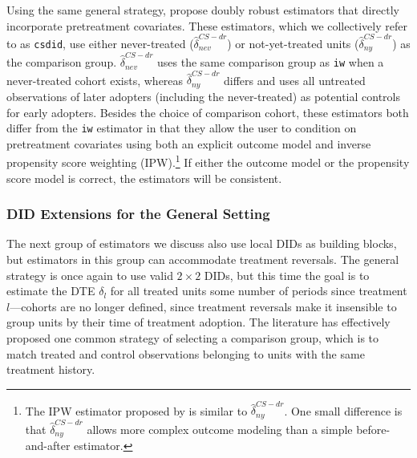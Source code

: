 \documentclass[12pt]{article}
\begin{document}
 Using the same general strategy, \citet{callaway2021-did} propose doubly robust estimators that directly incorporate pretreatment covariates. These estimators, which we collectively refer to as \texttt{csdid}, use either never-treated ($\hat\delta^{CS-dr}_{nev}$) or not-yet-treated units ($\hat\delta^{CS-dr}_{ny}$) as the comparison group. $\hat\delta^{CS-dr}_{nev}$ uses the same comparison group as \texttt{iw} when a never-treated cohort exists, whereas $\hat\delta^{CS-dr}_{ny}$ differs and uses all untreated observations of later adopters (including the never-treated) as potential controls for early adopters. Besides the choice of comparison cohort, these estimators both differ from the \texttt{iw} estimator in that they allow the user to condition on pretreatment covariates using both an explicit outcome model and inverse propensity score weighting (IPW).\footnote{The IPW estimator proposed by \citet{Strezhnev2018-ku} is similar to $\hat\delta^{CS-dr}_{ny}$. One small difference is that $\hat\delta^{CS-dr}_{ny}$ allows more complex outcome modeling than a simple before-and-after estimator.} If either the outcome model or the propensity score model is correct, the estimators will be consistent. 

\subsubsection{DID Extensions for the General Setting}
The next group of estimators we discuss also use local DIDs as building blocks, but estimators in this group can accommodate treatment reversals. The general strategy is once again to use valid $2\times 2$ DIDs, but this time the goal is to estimate the DTE $\delta_{l}$ for all treated units some number of periods since treatment $l$---cohorts are no longer defined, since treatment reversals make it insensible to group units by their time of treatment adoption. The literature has effectively proposed one common strategy of selecting a comparison group, which is to match treated and control observations belonging to units with the same treatment history.
\end{document}
